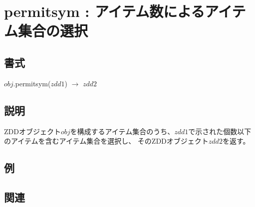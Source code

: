 
\section{permitsym : アイテム数によるアイテム集合の選択\label{sect:permitsym}}
\subsection*{書式}
$obj$.permitsym($zdd1$) $\rightarrow$ $zdd2$

\subsection*{説明}
ZDDオブジェクト$obj$を構成するアイテム集合のうち、$zdd1$で示された個数以下のアイテムを含むアイテム集合を選択し、
そのZDDオブジェクト$zdd2$を返す。

\subsection*{例}


\subsection*{関連}

